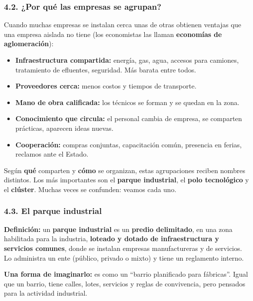 \subsubsection*{4.2. ¿Por qué las empresas se agrupan?}
Cuando muchas empresas se instalan cerca unas de otras obtienen ventajas que una empresa
aislada no tiene (los economistas las llaman \textbf{economías de aglomeración}):
\begin{itemize}
  \item \textbf{Infraestructura compartida:} energía, gas, agua, accesos para camiones,
        tratamiento de efluentes, seguridad. Más barata entre todos.
  \item \textbf{Proveedores cerca:} menos costos y tiempos de transporte.
  \item \textbf{Mano de obra calificada:} los técnicos se forman y se quedan en la zona.
  \item \textbf{Conocimiento que circula:} el personal cambia de empresa, se comparten
        prácticas, aparecen ideas nuevas.
  \item \textbf{Cooperación:} compras conjuntas, capacitación común, presencia en ferias,
        reclamos ante el Estado.
\end{itemize}
Según \textbf{qué} comparten y \textbf{cómo} se organizan, estas agrupaciones reciben nombres
distintos. Los más importantes son el \textbf{parque industrial}, el \textbf{polo
tecnológico} y el \textbf{clúster}. Muchas veces se confunden: veamos cada uno.

\subsubsection*{4.3. El parque industrial}

\begin{recuadro}
\textbf{Definición:} un \textbf{parque industrial} es un \textbf{predio delimitado}, en una zona
habilitada para la industria, \textbf{loteado y dotado de infraestructura y servicios
comunes}, donde se instalan empresas manufactureras y de servicios. Lo administra un ente
(público, privado o mixto) y tiene un reglamento interno.
\end{recuadro}

\textbf{Una forma de imaginarlo:} es como un ``barrio planificado para fábricas''. Igual que un
barrio, tiene calles, lotes, servicios y reglas de convivencia, pero pensados para la
actividad industrial.

